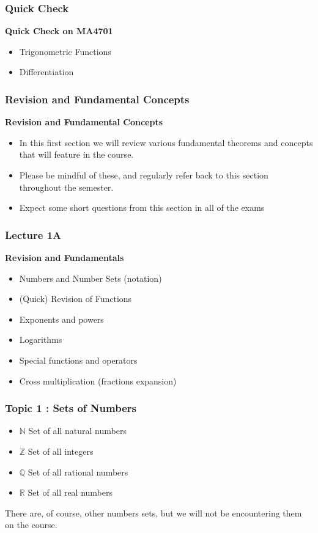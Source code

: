 \documentclass{beamer}
\begin{document}

\begin{frame}
\frametitle{Quick Check}
\textbf{Quick Check on MA4701}
\begin{itemize}
\item Trigonometric Functions
\item Differentiation
\end{itemize}

\end{frame}


\begin{frame}
	\frametitle{Revision and Fundamental Concepts}
	\textbf{Revision and Fundamental Concepts}
	\begin{itemize}
		\item	In this first section we will review various fundamental theorems and concepts that
		will feature in the course.
		\item	Please be mindful of these, and regularly refer back to this section 
		throughout the semester.
		\item Expect some short questions from this section in all of the exams
	\end{itemize}
	
\end{frame}
\begin{frame}
	\frametitle{Lecture 1A}
	\textbf{Revision and Fundamentals}
	
	\begin{itemize}
		\item Numbers and Number Sets (notation)
		\item (Quick) Revision of Functions
		\item Exponents and powers
		\item Logarithms
		\item Special functions and operators
		\item Cross multiplication (fractions expansion)
	\end{itemize}
\end{frame}

\begin{frame}
	\frametitle{Topic 1 : Sets of Numbers}
	\begin{itemize} 
		\item $\mathbb{N}$ Set of all natural numbers
		\item $\mathbb{Z}$ Set of all integers
		\item $\mathbb{Q}$ Set of all rational numbers
		\item $\mathbb{R}$ Set of all real numbers
	\end{itemize}
	
	\bigskip There are, of course, other numbers sets, but we will not be encountering them on the course.
\end{frame}
\end{document}
